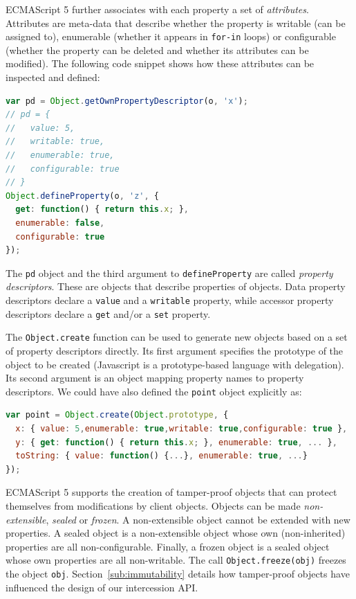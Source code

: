 \documentclass{sig-alternate}
\begin{document}
ECMAScript 5 further associates with each property a set of \emph{attributes}. Attributes are meta-data that describe whether the property is writable (can be assigned to), enumerable (whether it appears in \texttt{for-in} loops) or configurable (whether the property can be deleted and whether its attributes can be modified). The following code snippet shows how these attributes can be inspected and defined:

\begin{lstlisting}[language=javascript]
var pd = Object.getOwnPropertyDescriptor(o, 'x');
// pd = {
//   value: 5,
//   writable: true,
//   enumerable: true,
//   configurable: true 
// }
Object.defineProperty(o, 'z', {
  get: function() { return this.x; },
  enumerable: false,
  configurable: true
});
\end{lstlisting}

The \texttt{pd} object and the third argument to \texttt{defineProperty} are called \emph{property descriptors}. These are objects that describe properties of objects. Data property descriptors declare a \texttt{value} and a \texttt{writable} property, while accessor property descriptors declare a \texttt{get} and/or a \texttt{set} property.

The \texttt{Object.create} function can be used to generate new objects based on a set of property descriptors directly. Its first argument specifies the prototype of the object to be created (Javascript is a prototype-based language with delegation). Its second argument is an object mapping property names to property descriptors. We could have also defined the \texttt{point} object explicitly as:

\begin{lstlisting}[language=javascript]
var point = Object.create(Object.prototype, {
  x: { value: 5,enumerable: true,writable: true,configurable: true },
  y: { get: function() { return this.x; }, enumerable: true, ... },
  toString: { value: function() {...}, enumerable: true, ...}
});
\end{lstlisting}

ECMAScript 5 supports the creation of tamper-proof objects that can protect themselves from modifications by client objects. Objects can be made \emph{non-extensible}, \emph{sealed} or \emph{frozen}. A non-extensible object cannot be extended with new properties. A sealed object is a non-extensible object whose own (non-inherited) properties are all non-configurable. Finally, a frozen object is a sealed object whose own properties are all non-writable. The call \texttt{Object.freeze(obj)} freezes the object \texttt{obj}. Section~\ref{sub:immutability} details how tamper-proof objects have influenced the design of our intercession API.
\end{document}
